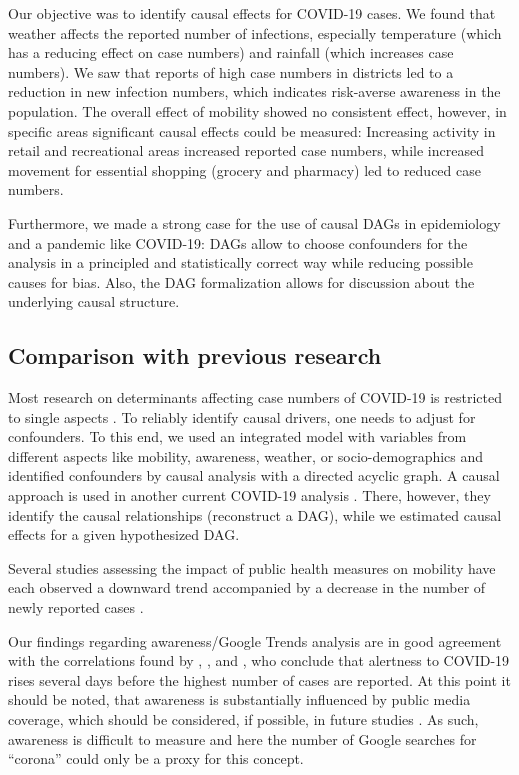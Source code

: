 \documentclass[]{elsarticle} %
\begin{document}
Our objective was to identify causal effects for COVID-19 cases. We
found that weather affects the reported number of infections, especially
temperature (which has a reducing effect on case numbers) and rainfall
(which increases case numbers). We saw that reports of high case numbers
in districts led to a reduction in new infection numbers, which
indicates risk-averse awareness in the population. The overall effect of
mobility showed no consistent effect, however, in specific areas
significant causal effects could be measured: Increasing activity in
retail and recreational areas increased reported case numbers, while
increased movement for essential shopping (grocery and pharmacy) led to
reduced case numbers.

Furthermore, we made a strong case for the use of causal DAGs in
epidemiology and a pandemic like COVID-19: DAGs allow to choose
confounders for the analysis in a principled and statistically correct
way while reducing possible causes for bias. Also, the DAG formalization
allows for discussion about the underlying causal structure.

\subsection{Comparison with previous
research}\label{comparison-with-previous-research}

Most research on determinants affecting case numbers of COVID-19 is
restricted to single aspects
\citep{fowler_effect_2020, li_retrospective_2020, shi_impact_2020, Wang2020temperature}.
To reliably identify causal drivers, one needs to adjust for
confounders. To this end, we used an integrated model with variables
from different aspects like mobility, awareness, weather, or
socio-demographics and identified confounders by causal analysis with a
directed acyclic graph. A causal approach is used in another current
COVID-19 analysis \citep{gencoglu2020causal}. There, however, they
identify the causal relationships (reconstruct a DAG), while we
estimated causal effects for a given hypothesized DAG.

Several studies assessing the impact of public health measures on
mobility have each observed a downward trend accompanied by a decrease
in the number of newly reported cases
\citep{chang_modeling_2020, cowling2020impact, fowler_effect_2020, kraemer_effect_2020, lai_effect_2020, linka_outbreak_2020}.

Our findings regarding awareness/Google Trends analysis are in good
agreement with the correlations found by
\citet{effenberger_association_2020}, \citet{higgins_correlations_2020},
and \citet{yuan_trends_2020}, who conclude that alertness to COVID-19
rises several days before the highest number of cases are reported. At
this point it should be noted, that awareness is substantially
influenced by public media coverage, which should be considered, if
possible, in future studies \citep{higgins_correlations_2020}. As such,
awareness is difficult to measure and here the number of Google searches
for ``corona'' could only be a proxy for this concept.
\end{document}
